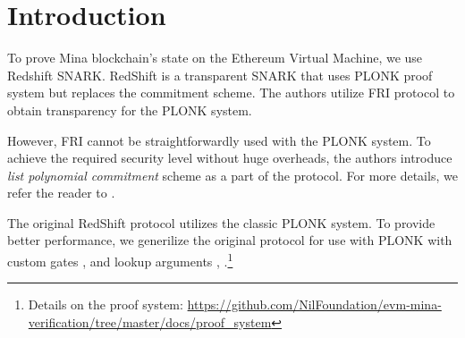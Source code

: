 \section{Introduction}
\label{section:introduction}

To prove Mina blockchain's state on the Ethereum Virtual Machine, we use Redshift SNARK\cite{cryptoeprint:2019:1400}.
RedShift is a transparent SNARK that uses PLONK\cite{cryptoeprint:2019:953} proof system but replaces the commitment scheme.
The authors utilize FRI\cite{ben2018fast} protocol to obtain transparency for the PLONK system.

However, FRI cannot be straightforwardly used with the PLONK system.
To achieve the required security level without huge overheads, the authors introduce \textit{list polynomial commitment} scheme as a part of the protocol.
For more details, we refer the reader to \cite{cryptoeprint:2019:1400}.

The original RedShift protocol utilizes the classic PLONK\cite{cryptoeprint:2019:953} system.
To provide better performance, we generilize the original protocol for use with PLONK with custom gates \cite{turbo}, \cite{plonkhalo2} and lookup arguments \cite{cryptoeprint:2020:315}, \cite{lookuphalo2}.\footnote{Details on the proof system: \url{https://github.com/NilFoundation/evm-mina-verification/tree/master/docs/proof_system}}
